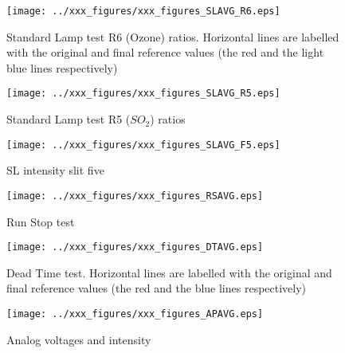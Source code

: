\begin{figure}[hbtp!]
\begin{center}
     \texttt{[image: ../xxx\_figures/xxx\_figures\_SLAVG\_R6.eps]}
     \caption{Standard Lamp test R6 (Ozone) ratios. Horizontal lines are labelled with the original and final reference values (the red and the light blue lines respectively)}
	   \label{fig:SLAVG_R6}
\end{center}
\end{figure}

\begin{figure}[hbtp!]
\begin{center}
     \texttt{[image: ../xxx\_figures/xxx\_figures\_SLAVG\_R5.eps]}
     \caption{Standard Lamp test R5 ($SO_2$) ratios}
	   \label{fig:SLAVG_R5}
\end{center}
\end{figure}
\begin{figure}[hbtp!]
\begin{center}
     \texttt{[image: ../xxx\_figures/xxx\_figures\_SLAVG\_F5.eps]}
     \caption{SL intensity slit five}
	   \label{fig:SLAVG_F5}
\end{center}
\end{figure}

\begin{figure}[hbtp!]
\begin{center}
\texttt{[image: ../xxx\_figures/xxx\_figures\_RSAVG.eps]}
           \caption{Run Stop test}
	         \label{fig:RSAVG}
\end{center}
\end{figure}

\begin{figure}[hbtp!]
\begin{center}
\texttt{[image: ../xxx\_figures/xxx\_figures\_DTAVG.eps]}
           \caption{Dead Time test. Horizontal lines are labelled with the original and final reference values (the red and the blue lines respectively)}
	         \label{fig:DTAVG}
\end{center}
\end{figure}

\begin{figure}[hbtp!]
\begin{center}
\texttt{[image: ../xxx\_figures/xxx\_figures\_APAVG.eps]}
           \caption{Analog voltages and intensity}
	         \label{fig:APAVG}
\end{center}
\end{figure}

